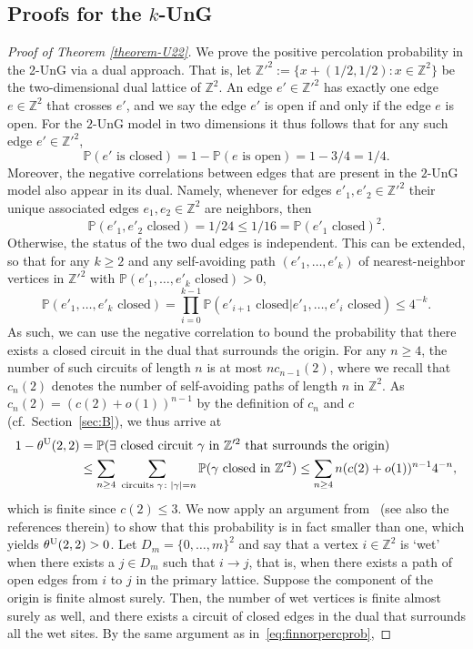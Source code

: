 \documentclass[a4paper, oneside, 11pt]{amsart}
\theoremstyle{definition}
\renewcommand{\P}{\mathbb{P}}
\newcommand{\1}{\mathbbm{1}}
\newcommand{\0}{\mathbf{o}}
\newcommand{\Z}{\mathbb{Z}}
\newcommand*{\be}{\begin{equation}}
\newcommand*{\ee}{\end{equation}}
\newcommand*{\ba}{\begin{aligned}}
\newcommand*{\ea}{\end{aligned}}
\numberwithin{equation}{section}
\begin{document}
\subsection{Proofs for the $k$-UnG}\label{sec:kungproof}
\begin{proof}[Proof of Theorem \ref{theorem-U22}]
    We prove the positive percolation probability in the 2-UnG via a dual approach. That is, let $\Z'^2:=\{x+(1/2,1/2): x\in \Z^2\}$ be the two-dimensional dual lattice of $\Z^2$. An edge $e'\in\Z'^2$ has exactly one edge $e\in\Z^2$ that crosses $e'$, and we say the edge $e'$ is open if and only if the edge $e$ is open. For the $2$-UnG model in two dimensions it thus follows that for any such edge $e'\in\Z'^2$, 
    \be 
    \P(e' \text{ is closed})=1-\P(e\text{ is open})=1-3/4=1/4.
    \ee 
    Moreover, the negative correlations between edges that are present in the $2$-UnG model also appear in its dual. Namely, whenever for edges $e'_1,e'_2\in\Z'^2$ their unique associated edges $e_1,e_2\in\Z^2$ are neighbors, then
    \be 
    \P(e'_1,e'_2\text{ closed})=1/24\leq 1/16=\P(e'_1\text{ closed})^2.
    \ee 
    Otherwise, the status of the two dual edges is independent.
    This can be extended, so that for any $k\geq 2$ and any self-avoiding path $(e'_1,\dots, e'_k)$ of nearest-neighbor vertices in $\Z'^2$ with $\P(e'_1,\dots, e'_k\text{ closed})>0$, 
    \be 
    \P(e'_1,\dots, e'_k\text{ closed})= \prod_{i=0}^{k-1}\P(e'_{i+1}\text{ closed}|e'_1,\dots,e'_i\text{ closed})\le 4^{-k}.
    \ee 
    As such, we can use the negative correlation to bound the probability that there exists a closed circuit in the dual that surrounds the origin. For any $n\geq 4$, the number of such circuits of length $n$ is at most $nc_{n-1}(2)$, where we recall that $c_n(2)$ denotes the number of self-avoiding paths of length $n$ in $\Z^2$. As $c_n(2)=(c(2)+o(1))^{n-1}$ by the definition of $c_n$ and $c$ (cf.~Section~\ref{sec:B}), we thus arrive at 
    \be \ba\label{eq:finnorpercprob}
    1-\theta^{\rm U}(2,2)&=\P(\exists \text{ closed circuit }\gamma \text{ in }\Z'^2\text{ that surrounds the origin})\\
    &\leq \sum_{n\ge4} \sum_{\text{ circuits }\gamma\colon|\gamma|=n}\P(\gamma\text{ closed in }\Z'^2)\leq \sum_{n\ge4} n(c(2)+o(1))^{n-1} 4^{-n}, 
    \ea \ee 
    which is finite since $c(2)\leq 3$. We now apply an argument from~\cite{JanSwart} (see also the references therein) to show that this probability is in fact smaller than one, which yields $\theta^{\rm U}(2,2)>0$. Let $D_m=\{0,\ldots, m\}^2$ and say that a vertex $i\in \Z^2$ is `wet' when there exists a $j\in D_m$ such that $i\to j$, that is, when there exists a path of open edges from $i$ to $j$ in the primary lattice. Suppose the component of the origin is finite almost surely. Then, the number of wet vertices is finite almost surely as well, and there exists a circuit of closed edges in the dual that surrounds all the wet sites. By the same argument as in~\eqref{eq:finnorpercprob}, 

\end{proof}
\end{document}
